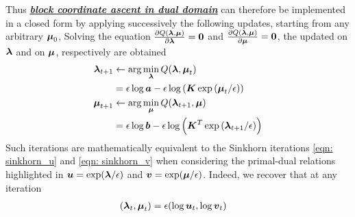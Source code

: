 \documentclass[11pt]{article}
\begin{document}
Thus \underline{\textbf{\emph{block coordinate ascent in dual domain}}} can therefore be implemented in a closed form by applying successively the following updates, starting from any arbitrary $\boldsymbol{\mu}_{0}$,
Solving the equation $\frac{\partial Q(\boldsymbol{\lambda}, \boldsymbol{\mu})}{ \partial \boldsymbol{\lambda}} = \boldsymbol{0}$ and $\frac{\partial Q(\boldsymbol{\lambda}, \boldsymbol{\mu})}{ \partial \boldsymbol{\mu}} = \boldsymbol{0}$, the updated on $\boldsymbol{\lambda}$ and on $\boldsymbol{\mu}$, respectively are obtained
\begin{align}
\boldsymbol{\lambda}_{t+1} &\leftarrow \arg\min_{\boldsymbol{\lambda}}Q(\boldsymbol{\lambda}, \boldsymbol{\mu}_{t})\nonumber\\
&= \epsilon \log \boldsymbol{a} - \epsilon \log\left(\boldsymbol{K}\exp\left(\boldsymbol{\mu}_{t}/\epsilon\right)\right) \label{eqn: block_coordinate_ascent_dual_lambda}\\
\boldsymbol{\mu}_{t+1} &\leftarrow  \arg\min_{\boldsymbol{\mu}}Q(\boldsymbol{\lambda}_{t+1}, \boldsymbol{\mu})\nonumber\\
&= \epsilon \log \boldsymbol{b} - \epsilon \log\left(\boldsymbol{K}^{T}\exp\left(\boldsymbol{\lambda}_{t+1}/\epsilon\right)\right)  \label{eqn: block_coordinate_ascent_dual_mu}
\end{align} Such iterations are mathematically equivalent to the Sinkhorn iterations \eqref{eqn: sinkhorn_u} and \eqref{eqn: sinkhorn_v} when considering the primal-dual relations highlighted in $\boldsymbol{u} = \exp(\boldsymbol{\lambda}/\epsilon)$ and $\boldsymbol{v} =   \exp(\boldsymbol{\mu}/\epsilon)$. Indeed, we recover that at any iteration
\begin{align*}
(\boldsymbol{\lambda}_{t}, \boldsymbol{\mu}_{t}) &= \epsilon(\log \boldsymbol{u}_{t}, \log \boldsymbol{v}_{t})
\end{align*}
\end{document}
